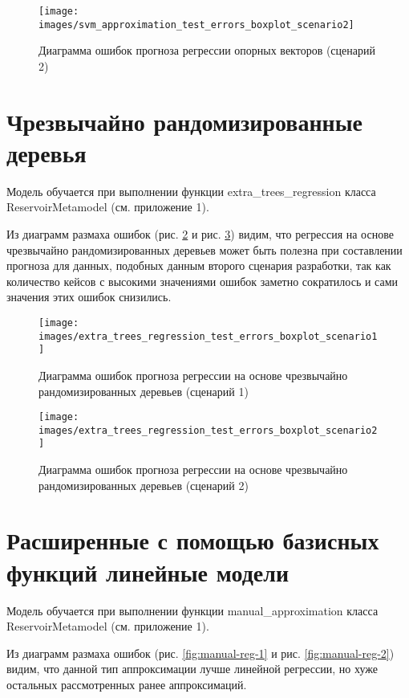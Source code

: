 \begin{figure}[H] 
	\center
	\texttt{[image: images/svm\_approximation\_test\_errors\_boxplot\_scenario2]}
	\caption{Диаграмма ошибок прогноза регрессии опорных векторов (сценарий 2)} 
	\label{fig:svm-reg-2}
\end{figure}

\section{Чрезвычайно рандомизированные деревья} \label{ch1:sec4}

Модель обучается при выполнении функции extra\_trees\_regression класса ReservoirMetamodel (см. приложение 1).

Из диаграмм размаха ошибок (рис. \ref{fig:extra-trees-reg-1} и рис. \ref{fig:extra-trees-reg-2}) видим, что регрессия на основе чрезвычайно рандомизированных деревьев может быть полезна при составлении прогноза для данных, подобных данным второго сценария разработки, так как количество кейсов с высокими значениями ошибок заметно сократилось и сами значения этих ошибок снизились.

\begin{figure}[H] 
	\center
	\texttt{[image: images/extra\_trees\_regression\_test\_errors\_boxplot\_scenario1]}
	\caption{Диаграмма ошибок прогноза регрессии на основе чрезвычайно рандомизированных деревьев (сценарий 1)} 
	\label{fig:extra-trees-reg-1}
\end{figure}

\begin{figure}[H] 
	\center
	\texttt{[image: images/extra\_trees\_regression\_test\_errors\_boxplot\_scenario2]}
	\caption{Диаграмма ошибок прогноза регрессии на основе чрезвычайно рандомизированных деревьев (сценарий 2)} 
	\label{fig:extra-trees-reg-2}
\end{figure}

\section{Расширенные с помощью базисных функций линейные модели} \label{ch1:sec5}

Модель обучается при выполнении функции manual\_approximation класса ReservoirMetamodel (см. приложение 1).

Из диаграмм размаха ошибок (рис. \ref{fig:manual-reg-1} и рис. \ref{fig:manual-reg-2}) видим, что данной тип аппроксимации лучше линейной регрессии, но хуже остальных рассмотренных ранее аппроксимаций.

